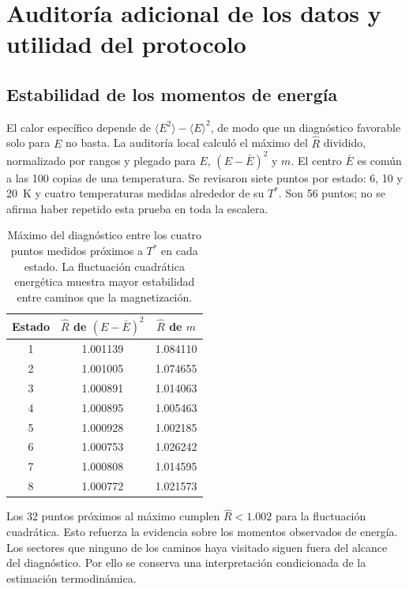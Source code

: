 \section{Auditoría adicional de los datos y utilidad del protocolo}
\label{sec:auditoria}

\subsection{Estabilidad de los momentos de energía}

El calor específico depende de $\langle E^2\rangle-\langle E\rangle^2$, de modo que un diagnóstico favorable solo para $E$ no basta. La auditoría local calculó el máximo del $\hat R$ dividido, normalizado por rangos y plegado para $E$, $(E-\bar E)^2$ y $m$. El centro $\bar E$ es común a las 100 copias de una temperatura. Se revisaron siete puntos por estado: 6, 10 y 20~K y cuatro temperaturas medidas alrededor de su $T^*$. Son 56 puntos; no se afirma haber repetido esta prueba en toda la escalera.

\begin{table}[H]\centering\small
\caption{Máximo del diagnóstico entre los cuatro puntos medidos próximos a $T^*$ en cada estado. La fluctuación cuadrática energética muestra mayor estabilidad entre caminos que la magnetización.}
\begin{tabular}{ccc}\toprule Estado & $\hat R$ de $(E-\bar E)^2$ & $\hat R$ de $m$\\\midrule
1 & 1.001139 & 1.084110 \\
2 & 1.001005 & 1.074655 \\
3 & 1.000891 & 1.014063 \\
4 & 1.000895 & 1.005463 \\
5 & 1.000928 & 1.002185 \\
6 & 1.000753 & 1.026242 \\
7 & 1.000808 & 1.014595 \\
8 & 1.000772 & 1.021573 \\
\bottomrule\end{tabular}\end{table}

Los 32 puntos próximos al máximo cumplen $\hat R<1.002$ para la fluctuación cuadrática. Esto refuerza la evidencia sobre los momentos observados de energía. Los sectores que ninguno de los caminos haya visitado siguen fuera del alcance del diagnóstico. Por ello se conserva una interpretación condicionada de la estimación termodinámica.

